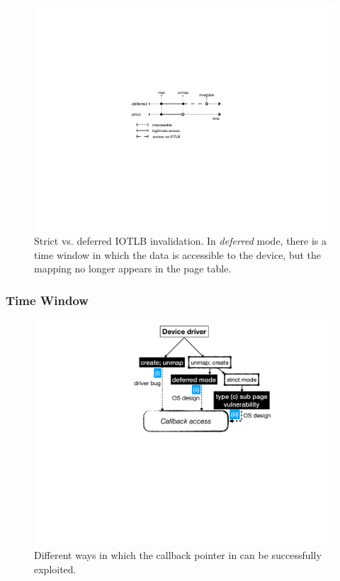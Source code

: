 \begin{figure}[t]
    \centering
    \includegraphics[width=0.75\columnwidth]{figs/strict.pdf}
    \caption{Strict vs. deferred IOTLB invalidation. In \emph{deferred} mode, there is a time window in which the data is accessible to the device, but the mapping no longer appears in the page table.}
    \label{fig:deferred}
\end{figure}

\subsubsection{Time Window}\label{sec:shinfo}

\begin{figure}[t]
    \centering
    \includegraphics[width=0.75\linewidth]{figs/road_to_op.pdf}
    \caption{Different ways in which the callback pointer in \shinfo can be successfully exploited.}
    \label{fig:road_to_op}
\end{figure}


